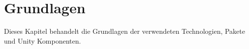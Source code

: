 \chapter{Grundlagen}
\label{sec:grundlagen}
Dieses Kapitel behandelt die Grundlagen der verwendeten Technologien, Pakete und Unity Komponenten.


